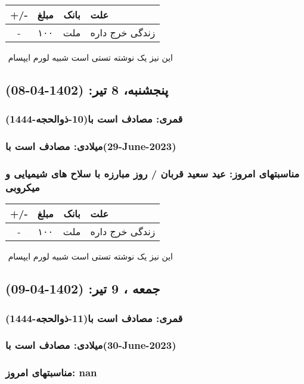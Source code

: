 \documentclass{article}
\newcommand{\rnote}[1]{\marginpar{\textcolor{color}{\StrSubstitute{\##1}{ }{\_}}}}
\newcommand{\myRow}[4]{
    #1 & #2 & #3 & #4 \\ \hline
}
\begin{document}
\begin{tabular}{ | c | c | c | p{5cm} |}
    \hline
    \myRow{ +/- }{مبلغ}{بانک}{علت}
    \myRow{-}{۱۰۰}{ملت}{زندگی خرج داره}
\end{tabular}
\newline
\newline

‌
\rnote{تست}
این نیز یک نوشته تستی است شبیه لورم ایپسام




\newpage
{}
\textcolor{color}{
\section{ پنجشنبه، 8 تیر: (1402-04-08) }
\subsubsection*{قمری: مصادف است با(10-ذوالحجه-1444)} 
\subsubsection*{میلادی: مصادف است با(29-June-2023)}
\subsubsection*{مناسبتهای امروز: عید سعید قربان / روز مبارزه با سلاح های شیمیایی و میکروبی}
}


\begin{tabular}{ | c | c | c | p{5cm} |}
    \hline
    \myRow{ +/- }{مبلغ}{بانک}{علت}
    \myRow{-}{۱۰۰}{ملت}{زندگی خرج داره}
\end{tabular}
\newline
\newline

‌
\rnote{تست}
این نیز یک نوشته تستی است شبیه لورم ایپسام




\newpage
{}
\textcolor{color}{
\section{ جمعه ، 9 تیر: (1402-04-09) }
\subsubsection*{قمری: مصادف است با(11-ذوالحجه-1444)} 
\subsubsection*{میلادی: مصادف است با(30-June-2023)}
\subsubsection*{مناسبتهای امروز: nan}
}
\end{document}
